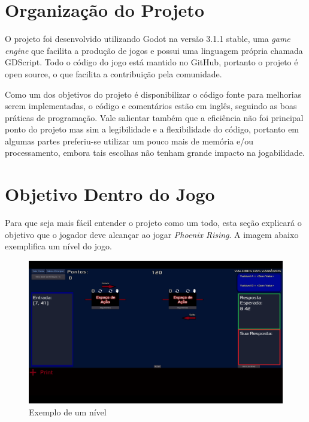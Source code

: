 \section{Organização do Projeto}
\label{sec:consideracoes_preliminares}

O projeto foi desenvolvido utilizando Godot na versão 3.1.1 stable, 
uma \textit{game engine} que facilita a produção de jogos e possui uma linguagem
própria chamada GDScript.
Todo o código do jogo está mantido no GitHub, portanto o projeto é open source,
o que facilita a contribuição pela comunidade.

Como um dos objetivos do projeto é disponibilizar o código fonte para
melhorias serem implementadas, o código e comentários estão em inglês, seguindo
as boas práticas de programação. Vale salientar também que a eficiência não foi
principal ponto do projeto mas sim a legibilidade e a flexibilidade do 
código, portanto em algumas partes preferiu-se utilizar um pouco mais de memória
e/ou processamento, embora tais escolhas não tenham grande impacto na 
jogabilidade.

\section{Objetivo Dentro do Jogo}
\label{sec:consideracoes_preliminares}

Para que seja mais fácil entender o projeto como um todo, esta seção explicará
o objetivo que o jogador deve alcançar ao jogar 
\textit{Phoenix Rising}. A imagem abaixo exemplifica um nível do jogo.

\begin{figure}[H]
    \includegraphics[width=\textwidth]{../figuras/exemplo_nivel.png}
    \caption{Exemplo de um nível}
\end{figure}

